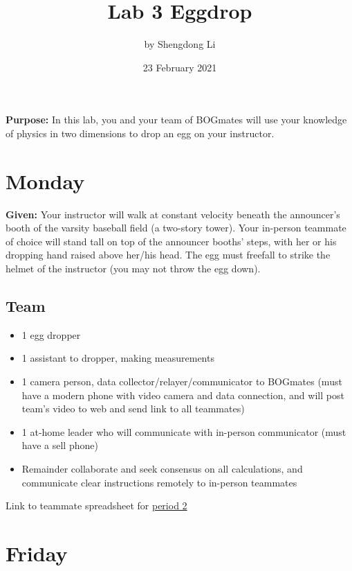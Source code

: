 \documentclass[12pt]{article}
\begin{document}
\title{Lab 3 Eggdrop}
\author{by Shengdong Li}
\date{23 February 2021}
\maketitle

\tableofcontents
\bigskip

\textbf{Purpose:} In this lab, you and your team of BOGmates will use your knowledge of physics in two dimensions to drop an egg on your instructor.

\section{Monday}

\textbf{Given:} Your instructor will walk at constant velocity beneath the announcer’s booth of the varsity baseball field (a two-story tower).  Your in-person teammate of choice will stand tall on top of the announcer booths’ steps, with her or his dropping hand raised above her/his head.  The egg must freefall to strike the helmet of the instructor (you may not throw the egg down).

\subsection{Team}
\begin{itemize}
	\item{1 egg dropper}
	\item{1 assistant to dropper, making measurements}
	\item{1 camera person, data collector/relayer/communicator to BOGmates (must have a modern phone with video camera and data connection, and will post team’s video to web and send link to all teammates)}
	\item{1 at-home leader who will communicate with in-person communicator (must have a sell phone)}
	\item{
	      Remainder collaborate and seek consensus on all calculations, and communicate clear instructions remotely  to in-person teammates
	      }
\end{itemize}

Link to teammate spreadsheet for \href{https://docs.google.com/spreadsheets/d/112zGZxcq4Y2s_ZFFPWRVIT6ZBOVhoSKDDAyddDDMR_E/edit#gid=1855240678}{period 2}

\section{Friday}
\end{document}

